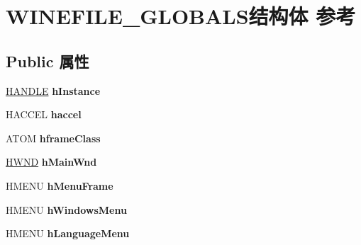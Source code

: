 \hypertarget{struct_w_i_n_e_f_i_l_e___g_l_o_b_a_l_s}{}\section{W\+I\+N\+E\+F\+I\+L\+E\+\_\+\+G\+L\+O\+B\+A\+L\+S结构体 参考}
\label{struct_w_i_n_e_f_i_l_e___g_l_o_b_a_l_s}
\subsection*{Public 属性}
\begin{DoxyCompactItemize}
\item 
\mbox{\label{struct_w_i_n_e_f_i_l_e___g_l_o_b_a_l_s_a22c6113a39e15da040e4118a89e73188}} 
\hyperlink{interfacevoid}{H\+A\+N\+D\+LE} {\bfseries h\+Instance}
\item 
\mbox{\label{struct_w_i_n_e_f_i_l_e___g_l_o_b_a_l_s_a1b97e9a6b72a278aa907649d0174ff53}} 
H\+A\+C\+C\+EL {\bfseries haccel}
\item 
\mbox{\label{struct_w_i_n_e_f_i_l_e___g_l_o_b_a_l_s_a693a419e87fb5e54df86bb5af4869836}} 
A\+T\+OM {\bfseries hframe\+Class}
\item 
\mbox{\label{struct_w_i_n_e_f_i_l_e___g_l_o_b_a_l_s_abfc17833c5933e7ccb2854d7463c7ebc}} 
\hyperlink{interfacevoid}{H\+W\+ND} {\bfseries h\+Main\+Wnd}
\item 
\mbox{\label{struct_w_i_n_e_f_i_l_e___g_l_o_b_a_l_s_ae15349077a4b1b188e1f83c66a006c12}} 
H\+M\+E\+NU {\bfseries h\+Menu\+Frame}
\item 
\mbox{\label{struct_w_i_n_e_f_i_l_e___g_l_o_b_a_l_s_ac90dfaf68656268b11352cb148c029e7}} 
H\+M\+E\+NU {\bfseries h\+Windows\+Menu}
\item 
\mbox{\label{struct_w_i_n_e_f_i_l_e___g_l_o_b_a_l_s_adf398840bfc9d8c0b4419733d59bfebb}} 
H\+M\+E\+NU {\bfseries h\+Language\+Menu}
\item 

\end{DoxyCompactItemize}

